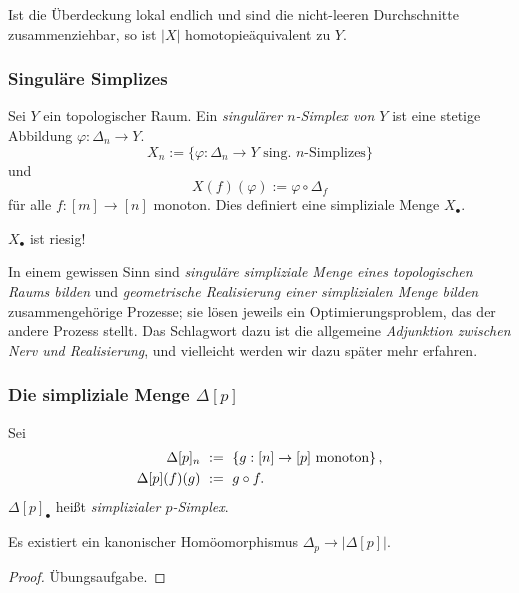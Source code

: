 \begin{bemerkung}
  Ist die Überdeckung lokal endlich und sind die nicht-leeren Durchschnitte
  zusammenziehbar, so ist $|X|$ homotopieäquivalent zu $Y$.
\end{bemerkung}


\subsubsection{Singuläre Simplizes}

\begin{definition}
  Sei $Y$ ein topologischer Raum. Ein \emph{singulärer $n$-Simplex von $Y$}
  ist eine stetige Abbildung $\varphi:\Delta_n \to Y$.
  \[ X_n := \{\varphi:\Delta_n \to Y\text{ sing. $n$-Simplizes}\}\]
  und
  \[ X(f)(\varphi) := \varphi\circ \Delta_f\]
  für alle $f:[m] \to [n]$ monoton. Dies definiert eine simpliziale Menge
  $X_\bullet$.
\end{definition}

\begin{bemerkung}
  $X_\bullet$ ist riesig!
\end{bemerkung}

\begin{bemerkung}
  In einem gewissen Sinn sind \emph{singuläre simpliziale Menge eines
  topologischen Raums bilden} und \emph{geometrische Realisierung einer
  simplizialen Menge bilden} zusammengehörige Prozesse; sie lösen jeweils ein
  Optimierungsproblem, das der andere Prozess stellt. Das Schlagwort dazu ist
  die allgemeine \emph{Adjunktion zwischen Nerv und Realisierung}, und
  vielleicht werden wir dazu später mehr erfahren.
\end{bemerkung}

\subsubsection{Die simpliziale Menge $\Delta[p]$}

\begin{definition}
  Sei
  \begin{align*}
    \Delta[p]_n \ &:=\  \{ g: [n]\to [p] \text{ monoton}\}\,, \\
    \Delta[p](f)(g) \ &:=\  g\circ f.
  \end{align*}
  $\Delta[p]_\bullet$ heißt \emph{simplizialer $p$-Simplex}.
\end{definition}

\begin{lemma}
  Es existiert ein kanonischer Homöomorphismus $\Delta_p \to |\Delta[p]|$.
\end{lemma}
\begin{proof}
  Übungsaufgabe.
\end{proof}


